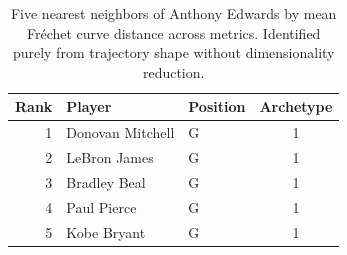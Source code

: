 \begin{table}[htbp]
  \centering\small
  \begin{tabular}{rllc}
    \toprule
    Rank & Player & Position & Archetype \\
    \midrule
    1 & Donovan Mitchell & G & 1 \\
    2 & LeBron James & G & 1 \\
    3 & Bradley Beal & G & 1 \\
    4 & Paul Pierce & G & 1 \\
    5 & Kobe Bryant & G & 1 \\
    \bottomrule
  \end{tabular}
  \caption{Five nearest neighbors of Anthony Edwards by mean Fr\'{e}chet curve distance across metrics. Identified purely from trajectory shape without dimensionality reduction.}
  \label{tab:Anthony_Edwards_frechet_curve_neighbors}
\end{table}

